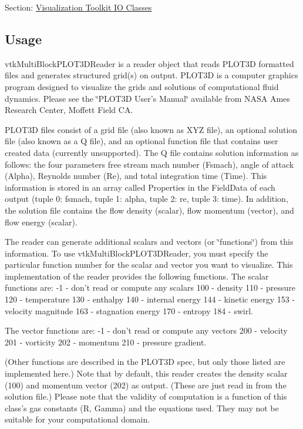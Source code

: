 Section\-: \hyperlink{sec_vtkio}{Visualization Toolkit I\-O Classes} \hypertarget{vtkwidgets_vtkxyplotwidget_Usage}{}\subsection{Usage}\label{vtkwidgets_vtkxyplotwidget_Usage}
vtk\-Multi\-Block\-P\-L\-O\-T3\-D\-Reader is a reader object that reads P\-L\-O\-T3\-D formatted files and generates structured grid(s) on output. P\-L\-O\-T3\-D is a computer graphics program designed to visualize the grids and solutions of computational fluid dynamics. Please see the \char`\"{}\-P\-L\-O\-T3\-D User's Manual\char`\"{} available from N\-A\-S\-A Ames Research Center, Moffett Field C\-A.

P\-L\-O\-T3\-D files consist of a grid file (also known as X\-Y\-Z file), an optional solution file (also known as a Q file), and an optional function file that contains user created data (currently unsupported). The Q file contains solution information as follows\-: the four parameters free stream mach number (Fsmach), angle of attack (Alpha), Reynolds number (Re), and total integration time (Time). This information is stored in an array called Properties in the Field\-Data of each output (tuple 0\-: fsmach, tuple 1\-: alpha, tuple 2\-: re, tuple 3\-: time). In addition, the solution file contains the flow density (scalar), flow momentum (vector), and flow energy (scalar).

The reader can generate additional scalars and vectors (or \char`\"{}functions\char`\"{}) from this information. To use vtk\-Multi\-Block\-P\-L\-O\-T3\-D\-Reader, you must specify the particular function number for the scalar and vector you want to visualize. This implementation of the reader provides the following functions. The scalar functions are\-: -\/1 -\/ don't read or compute any scalars 100 -\/ density 110 -\/ pressure 120 -\/ temperature 130 -\/ enthalpy 140 -\/ internal energy 144 -\/ kinetic energy 153 -\/ velocity magnitude 163 -\/ stagnation energy 170 -\/ entropy 184 -\/ swirl.

The vector functions are\-: -\/1 -\/ don't read or compute any vectors 200 -\/ velocity 201 -\/ vorticity 202 -\/ momentum 210 -\/ pressure gradient.

(Other functions are described in the P\-L\-O\-T3\-D spec, but only those listed are implemented here.) Note that by default, this reader creates the density scalar (100) and momentum vector (202) as output. (These are just read in from the solution file.) Please note that the validity of computation is a function of this class's gas constants (R, Gamma) and the equations used. They may not be suitable for your computational domain.


